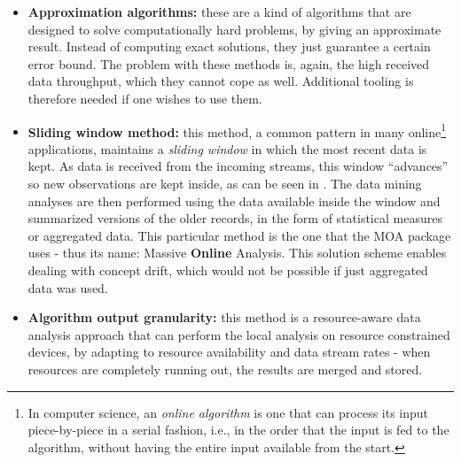 \begin{itemize}
	\item \textbf{Approximation algorithms:} these are a kind of algorithms that are designed to solve computationally hard problems, by giving an approximate result. Instead of computing exact solutions, they just guarantee a certain error bound. The problem with these methods is, again, the high received data throughput, which they cannot cope as well. Additional tooling is therefore needed if one wishes to use them.

	\item \textbf{Sliding window method:} this method, a common pattern in many online\footnote{In computer science, an \textit{online algorithm} is one that can process its input piece-by-piece in a serial fashion, i.e., in the order that the input is fed to the algorithm, without having the entire input available from the start.} applications, maintains a \textit{sliding window} in which the most recent data is kept. As data is received from the incoming streams, this window “advances” so new observations are kept inside, as can be seen in . The data mining analyses are then performed using the data available inside the window and summarized versions of the older records, in the form of statistical measures or aggregated data.
	This particular method is the one that the MOA package uses - thus its name: Massive \textbf{Online} Analysis. This solution scheme enables dealing with concept drift, which would not be possible if just aggregated data was used.

	\item \textbf{Algorithm output granularity:} this method is a resource-aware data analysis approach that can perform the local analysis on resource constrained devices, by adapting to resource availability and data stream rates - when resources are completely running out, the results are merged and stored.
\end{itemize}
